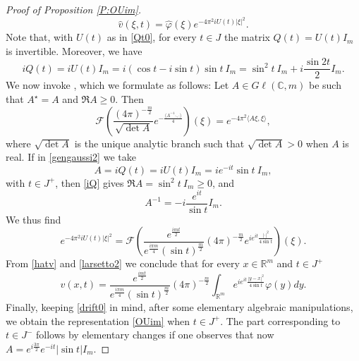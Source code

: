 \documentclass[11pt,a4paper]{amsart}
\def \vf{\varphi}
\newcommand{\Rm}{\mathbb R^m}
\numberwithin{equation}{section}
\newcommand{\sa}{\langle}
\newcommand{\da}{\rangle}
\numberwithin{equation}{section}
\begin{document}
\begin{proof}[Proof of Proposition \ref{P:OUim}]
\begin{equation}
\hat v(\xi,t) = \hat \vf(\xi) e^{-4\pi^2 i U(t) |\xi|^2}.
\end{equation} 
Note that, with $U(t)$ as in \eqref{Qt0}, for every $t\in J$ the matrix $Q(t) = U(t) I_m$ is invertible. Moreover, we have
\begin{equation}\label{iQ}
i Q(t) = i U(t) I_m = i(\cos t - i \sin t) \sin t\ I_m = \sin^2 t\ I_m + i \frac{\sin{2t}}2 I_m. 
\end{equation}
We now invoke \cite[Theorem 7.6.1]{Hobook}, which we formulate as follows: Let $A\in G\ell(\mathbb C,m)$ be such that $A^\star = A$ and $\Re A \ge 0$. Then 
\begin{equation}\label{gengaussi2}
\mathscr F\left(\frac{(4\pi)^{-\frac{m}{2}}}{\sqrt{\operatorname{det} A}} e^{- \frac{\sa A^{-1}\cdot,\cdot\da}{4}}\right)(\xi) =
e^{- 4 \pi^2  \sa A\xi,\xi\da},
\end{equation}
where $\sqrt{\operatorname{det} A}$ is the unique analytic branch such that $\sqrt{\operatorname{det} A}>0$ when $A$ is real. 
If in \eqref{gengaussi2} we take 
\[
A = i Q(t) = i U(t) I_m =  i e^{-it} \sin t\ I_m,
\]
with  $t\in J^+$, then \eqref{iQ} gives $\Re A = \sin^2 t\ I_m \ge 0$, and
\[
A^{-1} = - i  \frac{e^{it}}{\sin t} I_m.
\]
We thus find 
\begin{equation}\label{larsetto2}
e^{-4\pi^2 i U(t) |\xi|^2}  = \mathscr F\left(\frac{e^{\frac{imt}2}}{e^{\frac{i\pi m}{4}} (\sin t)^{\frac m2}}(4\pi
)^{-\frac{m}{2}} e^{i e^{it}\frac{|\cdot|^2}{4 \sin t}}\right)(\xi).
\end{equation}
From \eqref{hatv} and \eqref{larsetto2} we conclude that for every $x\in \Rm$ and $t\in J^+$
\begin{equation}\label{hatv2}
v(x,t) = \frac{e^{\frac{imt}2}}{e^{\frac{i\pi m}{4}} (\sin t)^{\frac m2}}(4\pi
)^{-\frac{m}{2}} \int_{\Rm} e^{i e^{it}\frac{|y-x|^2}{4 \sin t}} \vf(y) dy.
\end{equation} 
Finally, keeping \eqref{drift0} in mind, after some elementary algebraic manipulations, we obtain the representation \eqref{OUim} when $t\in J^+$. The part corresponding to $t\in J^-$ follows by elementary changes if one observes that now $A = e^{i\frac{3\pi}2} e^{-it} |\sin t| I_m$. 

\end{proof}
\end{document}
